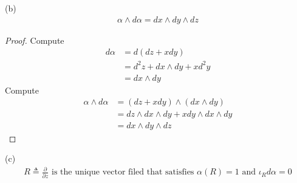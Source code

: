 \documentclass{report}
\begin{document}
\begin{theorem}
  (b)
\begin{align*}
\alpha \wedge  d \alpha  = dx \wedge  dy \wedge  dz   
\end{align*}
\end{theorem}
\begin{proof}
Compute 
\begin{align*}
d\alpha &= d(dz+xdy)\\
&=d^2z+dx\wedge  dy+ xd^2y \\
&=dx\wedge  dy   
\end{align*}
Compute 
\begin{align*}
\alpha \wedge  d\alpha &= (dz+xdy)\wedge (dx \wedge  dy )\\
&= dz\wedge  dx \wedge  dy + x dy \wedge  dx\wedge  dy \\
&=dx\wedge  dy \wedge  dz       
\end{align*}
\end{proof}
\begin{theorem}
 (c)
\begin{align*}
R\triangleq  \frac{\partial }{\partial z}\text{ is the unique vector filed that satisfies }\alpha (R)=1 \text{ and }\iota_R d\alpha =0 
\end{align*}
\end{theorem}
\end{document}
